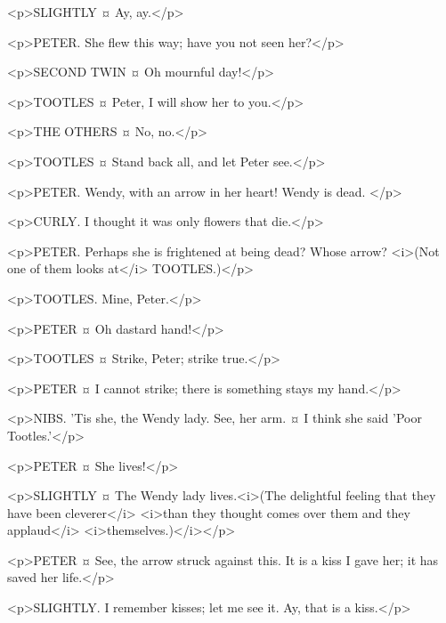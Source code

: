 <p>SLIGHTLY ¤
Ay, ay.</p>

<p>PETER. She flew this way; have you not seen her?</p>

<p>SECOND TWIN ¤
Oh mournful day!</p>

<p>TOOTLES ¤
Peter, I will show her to you.</p>

<p>THE OTHERS ¤
No, no.</p>

<p>TOOTLES ¤
Stand back all, and let Peter see.</p>


<p>PETER. Wendy, with an arrow in her heart!
Wendy is dead.
</p>

<p>CURLY. I thought it was only flowers that die.</p>

<p>PETER. Perhaps she is frightened at being dead?
Whose arrow? <i>(Not one of them looks at</i> TOOTLES.)</p>

<p>TOOTLES. Mine, Peter.</p>

<p>PETER ¤
Oh dastard hand!</p>

<p>TOOTLES ¤
Strike, Peter; strike true.</p>

<p>PETER ¤
I cannot strike; there is something stays my hand.</p>


<p>NIBS. 'Tis she, the Wendy lady. See, her arm.
¤
I think she said 'Poor Tootles.'</p>

<p>PETER ¤
She lives!</p>

<p>SLIGHTLY ¤
The Wendy lady lives.<i>(The delightful feeling that they have been cleverer</i> <i>than they thought comes over them and they applaud</i> <i>themselves.)</i></p>

<p>PETER ¤
See, the arrow struck against this. It is a kiss I gave her; it has saved her life.</p>

<p>SLIGHTLY. I remember kisses; let me see it.
Ay, that is a kiss.</p>

